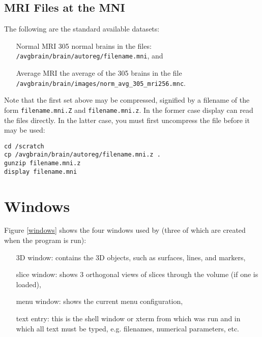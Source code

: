 \subsection{MRI Files at the MNI}

The following are the standard available datasets:

\begin{itemize}
\item[Normal MRI] 305 normal brains in the files:  {\tt /avgbrain/brain/autoreg/filename.mni}, and
\item[Average MRI] the average of the 305 brains in the file {\tt /avgbrain/brain/images/norm\_avg\_305\_mri256.mnc}.
\end{itemize}

Note that the first set above may be compressed, signified by a filename of
the form {\tt filename.mni.Z} and {\tt filename.mni.z}.  In the former case
display can read the files directly.  In the latter case, you must first
uncompress the file before it may be used:

\begin{verbatim}
cd /scratch
cp /avgbrain/brain/autoreg/filename.mni.z .
gunzip filename.mni.z
display filename.mni
\end{verbatim}

\section{\display Windows}


Figure \ref{windows} shows the four windows used by \display (three of which
are created when the program is run):

\begin{itemize}
\item[3D window:]  contains the 3D objects, such as surfaces, lines,
                  and markers,
\item[slice window:]  shows 3 orthogonal views of slices through the volume
                     (if one is loaded),
\item[menu window:]  shows the current menu configuration,
\item[text entry:]  this is the shell window or xterm from which \display was
                   run and in which all text must be typed, e.g. filenames,
                   numerical parameters, etc.
\end{itemize}

